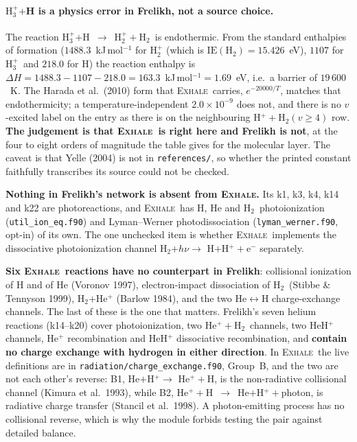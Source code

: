\documentclass[english,a4paper]{my_memo}
\newcommand{\EXHALE}{\textsc{Exhale}}
\newcommand{\Hth}{\ensuremath{\mathrm{H}_3^+}}
\newcommand{\Htwo}{\ensuremath{\mathrm{H}_2}}
\begin{document}
\paragraph{\Hth$ + $H is a physics error in Frelikh, not a source choice.}
The reaction \Hth$ + $H~$\rightarrow$~H$_2^+ + $\Htwo\ is endothermic. From
the standard enthalpies of formation ($1488.3$~kJ\,mol$^{-1}$ for H$_2^+$
(which is $\mathrm{IE}(\Htwo) = 15.426$~eV), $1107$ for \Hth\ and $218.0$ for
H) the reaction enthalpy is
$\Delta H = 1488.3 - 1107 - 218.0 = 163.3$~kJ\,mol$^{-1} = 1.69$~eV, i.e.\ a
barrier of $19\,600$~K. The Harada et al.\ (2010) form that \EXHALE\ carries,
$e^{-20000/T}$, matches that endothermicity; a temperature-independent
$2.0\times10^{-9}$ does not, and there is no $v$-excited label on the entry as
there is on the neighbouring H$^+ + \Htwo(v{\ge}4)$ row. \textbf{The judgement
is that \EXHALE\ is right here and Frelikh is not}, at the four to eight
orders of magnitude the table gives for the molecular layer. The caveat is
that Yelle (2004) is not in \texttt{references/}, so whether the printed
constant faithfully transcribes its source could not be checked.

\textbf{Nothing in Frelikh's network is absent from \EXHALE.} Its k1, k3, k4,
k14 and k22 are photoreactions, and \EXHALE\ has H, He and \Htwo\
photoionization (\texttt{util\_ion\_eq.f90}) and Lyman--Werner
photodissociation (\texttt{lyman\_werner.f90}, opt-in) of its own. The one
unchecked item is whether \EXHALE\ implements the dissociative photoionization
channel \Htwo$ + h\nu \rightarrow$ H$ + $H$^+ + $e$^-$ separately.

\textbf{Six \EXHALE\ reactions have no counterpart in Frelikh}: collisional
ionization of H and of He (Voronov 1997), electron-impact dissociation of
\Htwo\ (Stibbe \& Tennyson 1999), \Htwo$ + $He$^+$ (Barlow 1984), and the two
He$\leftrightarrow$H charge-exchange channels. The last of these is the one
that matters. Frelikh's seven helium reactions (k14--k20) cover
photoionization, two He$^+ + $\Htwo\ channels, two HeH$^+$ channels,
He$^+$ recombination and HeH$^+$ dissociative recombination, and
\textbf{contain no charge exchange with hydrogen in either direction}. In
\EXHALE\ the live definitions are in
\texttt{radiation/charge\_exchange.f90}, Group~B, and the two are not each
other's reverse: B1, He$ + $H$^+ \rightarrow$ He$^+ + $H, is the
non-radiative collisional channel (Kimura et al.\ 1993), while B2,
He$^+ + $H~$\rightarrow$~He$ + $H$^+ + $photon, is radiative charge transfer
(Stancil et al.\ 1998). A photon-emitting process has no collisional reverse,
which is why the module forbids testing the pair against detailed balance.
\end{document}
